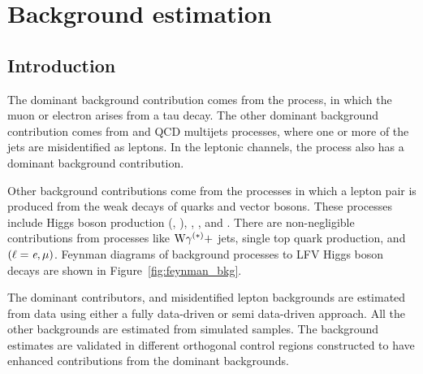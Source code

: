%
%

\chapter{Background estimation}
\label{bkg_est}

\section{Introduction}
The dominant background contribution comes from the \Ztt process, in which the muon or electron arises from a tau decay. The other dominant background contribution comes from \wjets and QCD multijets processes, where one or more of the jets are misidentified as leptons. In the leptonic channels, the \ttbar process also has a dominant background contribution.

Other background contributions come from the processes in which a lepton pair is produced from the weak decays of quarks and vector bosons. These processes include Higgs boson production (\Htt, \PW{}\PW), \PW{}\PW, \PW{}\PZ, and \PZ{}\PZ. There are non-negligible contributions from processes like $\text{W}\gamma^{(\ast)} +$ jets, single top quark production, and \Zll $(\ell=\textit{e},\mu)$. Feynman diagrams of background processes to LFV Higgs boson decays are shown in Figure~\ref{fig:feynman_bkg}.

The dominant contributors, \Ztt and misidentified lepton backgrounds are estimated from data using either a fully data-driven or semi data-driven approach. All the other backgrounds are estimated from simulated samples. The background estimates are validated in different orthogonal control regions constructed to have enhanced contributions from the dominant backgrounds.

